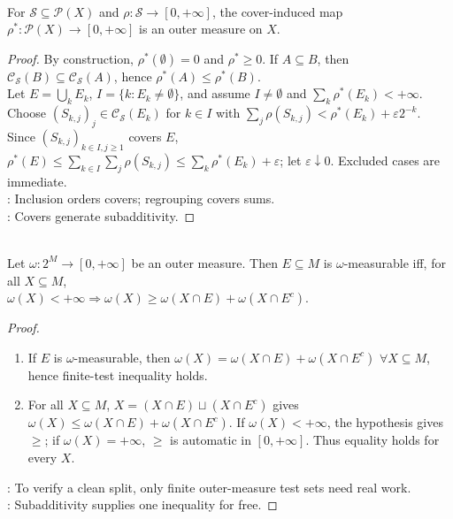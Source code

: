 \begin{proposition} \label{prop:cover-induced-set-function-is-outer-measure} \\
For $\mathcal{S}\subseteq\mathcal{P}(X)$ and $\rho:\mathcal{S}\to[0,+\infty]$, the cover-induced map $\rho^\ast:\mathcal{P}(X)\to[0,+\infty]$ is an outer measure on $X$.
\begin{proof} By construction, $\rho^\ast(\emptyset)=0$ and $\rho^\ast\geq0$. If $A\subseteq B$, then $\mathcal{C}_{\mathcal{S}}(B)\subseteq\mathcal{C}_{\mathcal{S}}(A)$, hence $\rho^\ast(A)\leq\rho^\ast(B)$.\\
Let $E=\bigcup\limits_kE_k$, $I=\{k:E_k\neq\emptyset\}$, and assume $I\neq\emptyset$ and $\sum\limits_k\rho^\ast(E_k)<+\infty$.\\
Choose $(S_{k,j})_j\in\mathcal{C}_{\mathcal{S}}(E_k)$ for $k\in I$ with $\sum\limits_j\rho(S_{k,j})<\rho^\ast(E_k)+\varepsilon2^{-k}$.\\
Since $(S_{k,j})_{k\in I,j\geq1}$ covers $E$, $\rho^\ast(E)\leq\sum\limits_{k\in I}\sum\limits_j\rho(S_{k,j})\leq\sum\limits_k\rho^\ast(E_k)+\varepsilon$; let $\varepsilon\downarrow0$. Excluded cases are immediate.\\
: Inclusion orders covers; regrouping covers sums.\\
: Covers generate subadditivity.
\end{proof}
\end{proposition}

\begin{lemma} \label{lem:caratheodory-finite-measure-test} \\
Let $\omega:2^M\to[0,+\infty]$ be an outer measure. Then $E\subseteq M$ is $\omega$-measurable iff, for all $X\subseteq M$,\\
$\omega(X)<+\infty\Longrightarrow \omega(X)\geq\omega(X\cap E)+\omega(X\cap E^c)$.
\begin{proof}
\begin{enumerate}[label=\roman*.]
\setlength{\itemsep}{0pt}
\item[$(\Rightarrow)$] If $E$ is $\omega$-measurable, then $\omega(X)=\omega(X\cap E)+\omega(X\cap E^c)$ $\forall X\subseteq M$, hence finite-test inequality holds.
\item[$(\Leftarrow)$] For all $X\subseteq M$, $X=(X\cap E)\sqcup(X\cap E^c)$ gives $\omega(X)\leq\omega(X\cap E)+\omega(X\cap E^c)$. If $\omega(X)<+\infty$, the hypothesis gives $\geq$; if $\omega(X)=+\infty$, $\geq$ is automatic in $[0,+\infty]$. Thus equality holds for every $X$.
\end{enumerate}
: To verify a clean split, only finite outer-measure test sets need real work.\\
: Subadditivity supplies one inequality for free.
\end{proof}
\end{lemma}

